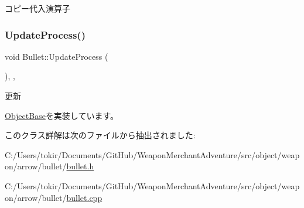 コピー代入演算子 

\mbox{\label{class_bullet_aa0867038c9c35e30ee09e21ecdccf281}} 
\subsubsection{\texorpdfstring{Update\+Process()}{UpdateProcess()}}
{\footnotesize\ttfamily void Bullet\+::\+Update\+Process (\begin{DoxyParamCaption}{ }\end{DoxyParamCaption})\hspace{0.3cm}{\ttfamily [final]}, {\ttfamily [protected]}, {\ttfamily [virtual]}}



更新 



\mbox{\hyperlink{class_object_base_a8b5b72b363a419767efde0b0e692ea95}{Object\+Base}}を実装しています。



このクラス詳解は次のファイルから抽出されました\+:\begin{DoxyCompactItemize}
\item 
C\+:/\+Users/tokir/\+Documents/\+Git\+Hub/\+Weapon\+Merchant\+Adventure/src/object/weapon/arrow/bullet/\mbox{\hyperlink{bullet_8h}{bullet.\+h}}\item 
C\+:/\+Users/tokir/\+Documents/\+Git\+Hub/\+Weapon\+Merchant\+Adventure/src/object/weapon/arrow/bullet/\mbox{\hyperlink{bullet_8cpp}{bullet.\+cpp}}\end{DoxyCompactItemize}
